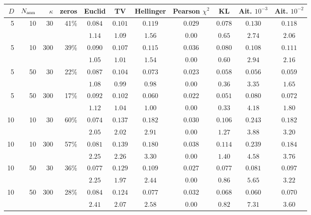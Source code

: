 \begin{tabular}{rrrrccccccc}\toprule
$D$ & $N_{\rm ann}$ & $\kappa$ & zeros & Euclid & TV & Hellinger & Pearson $\chi^2$ & KL & Ait. $10^{-3}$ & Ait. $10^{-2}$\\\midrule
5 & 10 & 30 & 41\% & $0.084$ & $0.101$ & $0.119$ & $\mathbf{0.029}$ & $0.078$ & $0.130$ & $0.118$\\
 & & & & $1.14$ & $1.09$ & $1.56$ & $\mathbf{0.00}$ & $0.65$ & $2.74$ & $2.06$\\[-1pt]
5 & 10 & 300 & 39\% & $0.090$ & $0.107$ & $0.115$ & $\mathbf{0.036}$ & $0.080$ & $0.108$ & $0.111$\\
 & & & & $1.05$ & $1.01$ & $1.54$ & $\mathbf{0.00}$ & $0.60$ & $2.94$ & $2.16$\\[-1pt]
5 & 50 & 30 & 22\% & $0.087$ & $0.104$ & $0.073$ & $\mathbf{0.023}$ & $0.058$ & $0.056$ & $0.059$\\
 & & & & $1.08$ & $0.99$ & $0.98$ & $\mathbf{0.00}$ & $0.36$ & $3.35$ & $1.65$\\[-1pt]
5 & 50 & 300 & 17\% & $0.092$ & $0.102$ & $0.060$ & $\mathbf{0.022}$ & $0.051$ & $0.080$ & $0.072$\\
 & & & & $1.12$ & $1.04$ & $1.00$ & $\mathbf{0.00}$ & $0.33$ & $4.18$ & $1.80$\\[-1pt]
10 & 10 & 30 & 60\% & $0.074$ & $0.137$ & $0.182$ & $\mathbf{0.030}$ & $0.106$ & $0.243$ & $0.182$\\
 & & & & $2.05$ & $2.02$ & $2.91$ & $\mathbf{0.00}$ & $1.27$ & $3.88$ & $3.20$\\[-1pt]
10 & 10 & 300 & 57\% & $0.081$ & $0.139$ & $0.180$ & $\mathbf{0.038}$ & $0.114$ & $0.239$ & $0.184$\\
 & & & & $2.25$ & $2.26$ & $3.30$ & $\mathbf{0.00}$ & $1.40$ & $4.58$ & $3.76$\\[-1pt]
10 & 50 & 30 & 36\% & $0.077$ & $0.129$ & $0.109$ & $\mathbf{0.027}$ & $0.077$ & $0.081$ & $0.097$\\
 & & & & $2.25$ & $1.97$ & $2.44$ & $\mathbf{0.00}$ & $0.86$ & $5.65$ & $3.22$\\[-1pt]
10 & 50 & 300 & 28\% & $0.084$ & $0.124$ & $0.077$ & $\mathbf{0.032}$ & $0.068$ & $0.060$ & $0.070$\\
 & & & & $2.41$ & $2.07$ & $2.58$ & $\mathbf{0.00}$ & $0.82$ & $7.31$ & $3.60$\\[-1pt]
\bottomrule\end{tabular}
